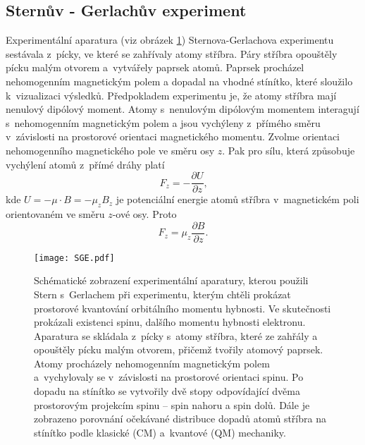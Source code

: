 \subsection{Sternův - Gerlachův experiment}
\label{kap:SG experiment}

Experimentální aparatura (viz obrázek \ref{obr:SCH-experiment}) Sternova-Gerlachova experimentu sestávala z~pícky, ve které se zahřívaly atomy stříbra. Páry stříbra opouštěly pícku malým otvorem a~vytvářely paprsek atomů. Paprsek procházel nehomogenním magnetickým polem a dopadal na vhodné stínítko, které sloužilo k~vizualizaci výsledků. Předpokladem experimentu je, že atomy stříbra mají nenulový dipólový moment. Atomy s~nenulovým dipólovým momentem interagují s~nehomogenním magnetickým polem a jsou vychýleny z~přímého směru v~závislosti na prostorové orientaci magnetického momentu. Zvolme orientaci nehomogenního magnetického pole ve směru osy $z$. Pak pro sílu, která způsobuje vychýlení atomů z~přímé dráhy platí
\begin{equation}
F_z = - \frac{\partial U}{\partial z } \mbox{,}
\label{rov:Spin5}
\end{equation}
kde $U = - \mu \cdot B = - \mu_z B_z$ je potenciální energie atomů stříbra v~magnetickém poli orientovaném ve směru $z$-ové osy. Proto 
\begin{equation}
F_z = \mu_z \frac{\partial B}{\partial z } \mbox{.}
\label{rov:Spin6}
\end{equation}

\begin{figure} [!ht]
\centering
\texttt{[image: SGE.pdf]}
\caption[Sternův - Gerlachův experiment]{Schématické zobrazení experimentální aparatury, kterou použili Stern s~Gerlachem při experimentu, kterým chtěli prokázat prostorové kvantování orbitálního momentu hybnosti. Ve skutečnosti prokázali existenci spinu, dalšího momentu hybnosti elektronu. Aparatura se skládala z~pícky s~atomy stříbra, které ze zahřály a opouštěly pícku malým otvorem, přičemž tvořily atomový paprsek. Atomy procházely nehomogenním magnetickým polem a~vychylovaly se v~závislosti na prostorové orientaci spinu. Po dopadu na stínítko se vytvořily dvě stopy odpovídající dvěma prostorovým projekcím spinu -- spin nahoru a spin dolů. Dále je zobrazeno porovnání očekávané distribuce dopadů atomů stříbra na stínítko podle klasické (CM) a~kvantové (QM) mechaniky.}
\label{obr:SCH-experiment}
\end{figure}


